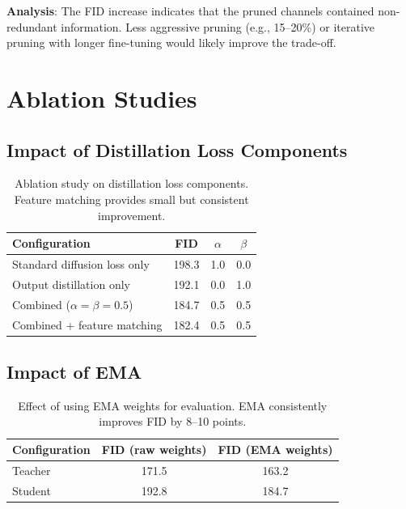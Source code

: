 \documentclass[12pt]{report}
\theoremstyle{definition}
\begin{document}
\textbf{Analysis}: The FID increase indicates that the pruned channels contained non-redundant information. Less aggressive pruning (e.g., 15--20\%) or iterative pruning with longer fine-tuning would likely improve the trade-off.

\section{Ablation Studies}

\subsection{Impact of Distillation Loss Components}

\begin{table}[H]
\centering
\begin{tabular}{lccc}
\toprule
\textbf{Configuration} & \textbf{FID} & \textbf{$\alpha$} & \textbf{$\beta$} \\
\midrule
Standard diffusion loss only & 198.3 & 1.0 & 0.0 \\
Output distillation only & 192.1 & 0.0 & 1.0 \\
Combined ($\alpha = \beta = 0.5$) & 184.7 & 0.5 & 0.5 \\
Combined + feature matching & 182.4 & 0.5 & 0.5 \\
\bottomrule
\end{tabular}
\caption{Ablation study on distillation loss components. Feature matching provides small but consistent improvement.}
\label{tab:ablation_distillation}
\end{table}

\subsection{Impact of EMA}

\begin{table}[H]
\centering
\begin{tabular}{lcc}
\toprule
\textbf{Configuration} & \textbf{FID (raw weights)} & \textbf{FID (EMA weights)} \\
\midrule
Teacher & 171.5 & 163.2 \\
Student & 192.8 & 184.7 \\
\bottomrule
\end{tabular}
\caption{Effect of using EMA weights for evaluation. EMA consistently improves FID by 8--10 points.}
\label{tab:ablation_ema}
\end{table}
\end{document}
